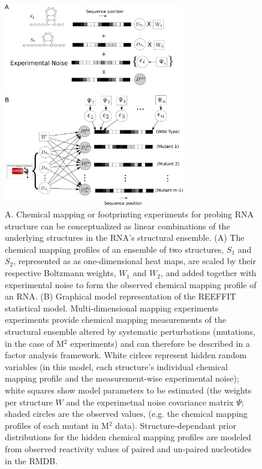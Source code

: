 \documentclass[12pt]{article}
\begin{document}
\begin{figure}[here]
\includegraphics[width=0.7\textwidth]{figures/statmodel.png}
\caption{A. Chemical mapping or footprinting experiments for probing RNA structure can be conceptualized as linear combinations of the underlying structures in the RNA's structural ensemble. (A) The chemical mapping profiles of an ensemble of two structures, $S_1$ and $S_2$, represented as as one-dimensional heat maps, are scaled by their respective Boltzmann weights, $W_1$ and $W_2$, and added together with experimental noise to form the observed chemical mapping profile of an RNA. (B) Graphical model representation of the REEFFIT statistical model. Multi-dimensional mapping experiments experiments provide chemical mapping measurements of the structural ensemble altered by systematic perturbations (mutations, in the case of M$^2$ experiments) and can therefore be described in a factor analysis framework. White cirlces represent hidden random variables (in this model, each structure's individual chemical mapping profile and the measurement-wise experimental noise); white squares show model parameters to be estimated (the weights per structure $W$ and the experimetnal noise covariance matrix $\Psi$; shaded circles are the observed values, (e.g. the chemical mapping profiles of each mutant in M$^2$ data). Structure-dependant prior distributions for the hidden chemical mapping profiles are modeled from observed reactivity values of paired and un-paired nucleotides in the RMDB.}
\label{fig:statmodelfig}
\end{figure}
\end{document}
